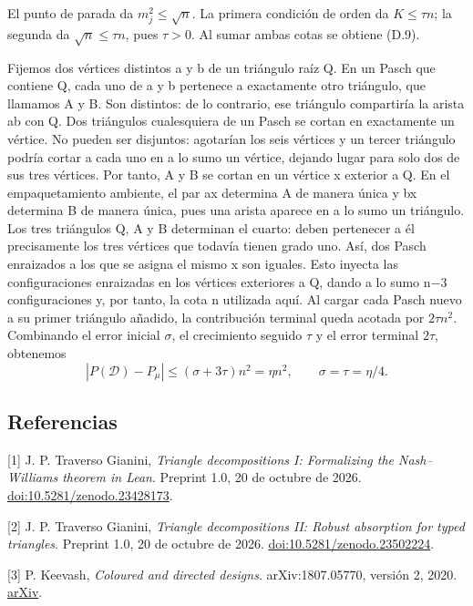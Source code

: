 \documentclass[spanish,11pt,a4paper]{article}
\begin{document}
El punto de parada da \(m_j^2\leq\sqrt n\). La primera condición de orden da \(K\leq\tau n\); la segunda da \(\sqrt n\leq\tau n\), pues \(\tau>0\). Al sumar ambas cotas se obtiene (D.9).

Fijemos dos vértices distintos a y b de un triángulo raíz Q. En un Pasch que contiene Q, cada uno de a y b pertenece a exactamente otro triángulo, que llamamos A y B. Son distintos: de lo contrario, ese triángulo compartiría la arista ab con Q. Dos triángulos cualesquiera de un Pasch se cortan en exactamente un vértice. No pueden ser disjuntos: agotarían los seis vértices y un tercer triángulo podría cortar a cada uno en a lo sumo un vértice, dejando lugar para solo dos de sus tres vértices. Por tanto, A y B se cortan en un vértice x exterior a Q. En el empaquetamiento ambiente, el par ax determina A de manera única y bx determina B de manera única, pues una arista aparece en a lo sumo un triángulo. Los tres triángulos Q, A y B determinan el cuarto: deben pertenecer a él precisamente los tres vértices que todavía tienen grado uno. Así, dos Pasch enraizados a los que se asigna el mismo x son iguales. Esto inyecta las configuraciones enraizadas en los vértices exteriores a Q, dando a lo sumo n−3 configuraciones y, por tanto, la cota n utilizada aquí. Al cargar cada Pasch nuevo a su primer triángulo añadido, la contribución terminal queda acotada por \(2\tau n^2\). Combinando el error inicial \(\sigma\), el crecimiento seguido \(\tau\) y el error terminal \(2\tau\), obtenemos
\[|P(\mathcal D)-P_\mu|\leq(\sigma+3\tau)n^2=\eta n^2,\qquad \sigma=\tau=\eta/4.\tag{D.10}\]


\clearpage
\subsection{Referencias}\label{referencias}

\begingroup\small\raggedright\setlength{\parskip}{3pt}

{[}1{]} J. P. Traverso Gianini, \emph{Triangle decompositions I: Formalizing the Nash--Williams theorem in Lean}. Preprint 1.0, 20 de octubre de 2026. \href{https://doi.org/10.5281/zenodo.23428173}{doi:10.5281/zenodo.23428173}.

{[}2{]} J. P. Traverso Gianini, \emph{Triangle decompositions II: Robust absorption for typed triangles}. Preprint 1.0, 20 de octubre de 2026. \href{https://doi.org/10.5281/zenodo.23502224}{doi:10.5281/zenodo.23502224}.

{[}3{]} P. Keevash, \emph{Coloured and directed designs}. arXiv:1807.05770, versión 2, 2020. \href{https://arxiv.org/abs/1807.05770v2}{arXiv}.
\end{document}
